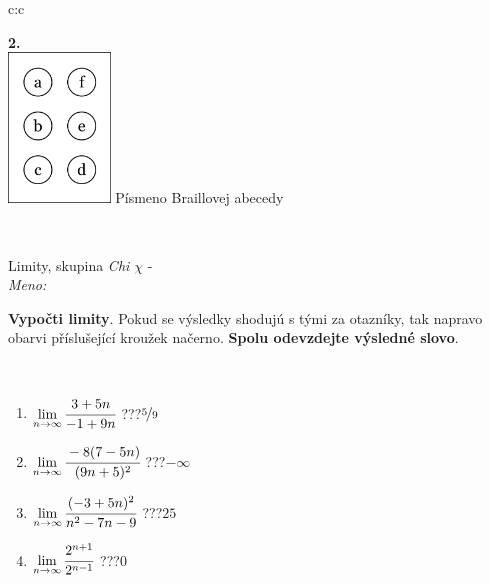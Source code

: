 \documentclass[10pt]{report}
\begin{document}
\begin{tabular}{c:c}
\begin{minipage}[c][104.5mm][t]{0.5\linewidth}
\begin{center}
\begin{minipage}{0.20\linewidth}
\begin{center}
{\Huge\bfseries 2.} \\[2mm]
\includegraphics[height=40mm]{../images/braille.png}
{\small Písmeno Braillovej abecedy}
\end{center}
\end{minipage}
\end{center}
\end{minipage}
\\ \hdashline
\begin{minipage}[c][104.5mm][t]{0.5\linewidth}
\begin{center}
\vspace{7mm}
{\huge Limity, skupina \textit{Chi $\chi$} -}\\[5mm]
\textit{Meno:}\phantom{xxxxxxxxxxxxxxxxxxxxxxxxxxxxxxxxxxxxxxxxxxxxxxxxxxxxxxxxxxxxxxxxx}\\[5mm]
\begin{minipage}{0.95\linewidth}
\begin{center}
\textbf{Vypočti limity}. Pokud se výsledky shodujú s tými za otazníky, tak napravo\\obarvi příslušející kroužek načerno. \textbf{Spolu odevzdejte výsledné slovo}.
\end{center}
\end{minipage}
\\[1mm]
\begin{minipage}{0.79\linewidth}
\begin{center}
\begin{varwidth}{\linewidth}
\begin{enumerate}
\normalsize
\item $\lim\limits_{n\to\infty}\cfrac{3+5n}{-1+9n}$\quad \dotfill\; ???\;\dotfill \quad $\nicefrac{5}{9}$
\item $\lim\limits_{n\to\infty}\cfrac{-8(7-5n)}{(9n+5)^2}$\quad \dotfill\; ???\;\dotfill \quad $-\infty$
\item $\lim\limits_{n\to\infty}\cfrac{(-3+5n)^2}{n^2-7n-9}$\quad \dotfill\; ???\;\dotfill \quad $25$
\item $\lim\limits_{n\to\infty}\cfrac{2^{n+1}}{2^{n-1}}$\quad \dotfill\; ???\;\dotfill \quad $0$

\end{enumerate}
\end{varwidth}
\end{center}
\end{minipage}
\end{center}
\end{minipage}
\end{tabular}
\end{document}
